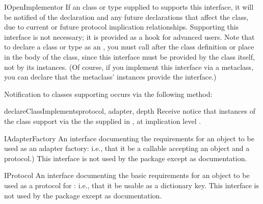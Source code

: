 \begin{verbatim%
}
\begin{verbatim%
}
\begin{verbatim%
}
\begin{verbatim%
}
\begin{classdesc*}{IOpenImplementor}
If an class or type supplied to  supports
this interface, it will be notified of the declaration and any future
declarations that affect the class, due to current or future protocol
implication relationships.  Supporting this interface is not necessary; it is
provided as a hook for advanced users.  Note that to declare a class or type
as an , you must call  after the class definition or place
 in the body of the class, since
this interface must be provided by the class itself, not by its instances.  (Of
course, if you implement this interface via a metaclass, you can declare that
the metaclass' instances provide the interface.)

Notification to classes supporting  occurs via the
following method:

\begin{methoddesc}{declareClassImplements}{protocol, adapter, depth}
Receive notice that instances of the class support  via the
the  supplied in , at implication level
.
\end{methoddesc}

\end{classdesc*}


















\begin{classdesc*}{IAdapterFactory}
An interface documenting the requirements for an object to be used as an
adapter factory: i.e., that it be a callable accepting an object and a
protocol.)  This interface is not used by the  package except
as documentation.
\end{classdesc*}


\begin{classdesc*}{IProtocol}
An interface documenting the basic requirements for an object to be used as
a protocol for : i.e., that it be usable as a dictionary
key.  This interface is not used by the  package except as
documentation.
\end{classdesc*}



\end{verbatim%
}
\end{verbatim%
}
\end{verbatim%
}
\end{verbatim%
}
